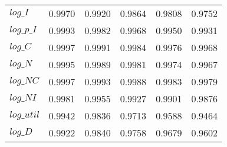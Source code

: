 \begin{center}
\begin{longtable}{lccccc}
$log\_I     $	 & 	    0.9970	 & 	    0.9920	 & 	    0.9864	 & 	    0.9808	 & 	    0.9752 \\ 
$log\_p\_I  $	 & 	    0.9993	 & 	    0.9982	 & 	    0.9968	 & 	    0.9950	 & 	    0.9931 \\ 
$log\_C     $	 & 	    0.9997	 & 	    0.9991	 & 	    0.9984	 & 	    0.9976	 & 	    0.9968 \\ 
$log\_N     $	 & 	    0.9995	 & 	    0.9989	 & 	    0.9981	 & 	    0.9974	 & 	    0.9967 \\ 
$log\_NC    $	 & 	    0.9997	 & 	    0.9993	 & 	    0.9988	 & 	    0.9983	 & 	    0.9979 \\ 
$log\_NI    $	 & 	    0.9981	 & 	    0.9955	 & 	    0.9927	 & 	    0.9901	 & 	    0.9876 \\ 
$log\_util  $	 & 	    0.9942	 & 	    0.9836	 & 	    0.9713	 & 	    0.9588	 & 	    0.9464 \\ 
$log\_D     $	 & 	    0.9922	 & 	    0.9840	 & 	    0.9758	 & 	    0.9679	 & 	    0.9602 \\ 
\end{longtable}
 \end{center}
